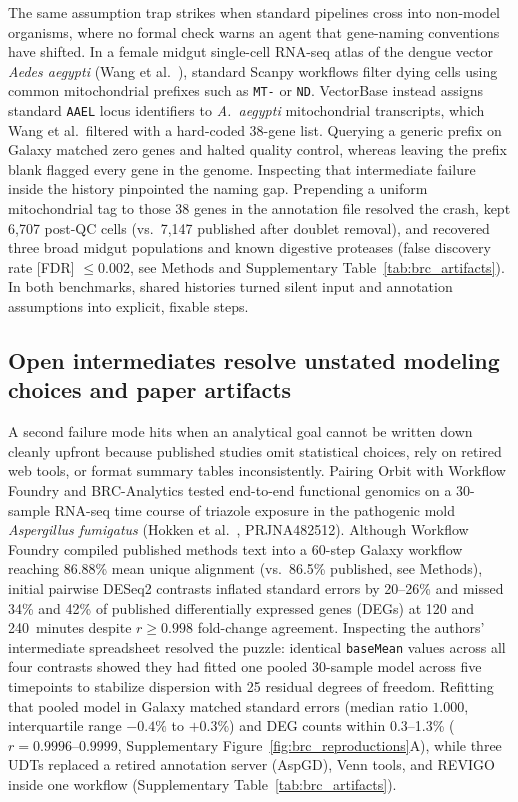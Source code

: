 \documentclass[11pt,letterpaper]{article}
\newcommand{\tool}[1]{\textsf{#1}}
\begin{document}
The same assumption trap strikes when standard pipelines cross into non-model organisms, where no formal check warns an agent that gene-naming conventions have shifted. In a female midgut single-cell RNA-seq atlas of the dengue vector \textit{Aedes aegypti} (Wang et al.\ \cite{wang2024}), standard \tool{Scanpy} workflows filter dying cells using common mitochondrial prefixes such as \texttt{MT-} or \texttt{ND}. VectorBase instead assigns standard \texttt{AAEL} locus identifiers to \textit{A.\ aegypti} mitochondrial transcripts, which Wang et al.\ filtered with a hard-coded 38-gene list. Querying a generic prefix on Galaxy matched zero genes and halted quality control, whereas leaving the prefix blank flagged every gene in the genome. Inspecting that intermediate failure inside the history pinpointed the naming gap. Prepending a uniform mitochondrial tag to those 38 genes in the annotation file resolved the crash, kept 6,707 post-QC cells (vs.\ 7,147 published after doublet removal), and recovered three broad midgut populations and known digestive proteases (false discovery rate [FDR] $\le 0.002$, see Methods and Supplementary Table~\ref{tab:brc_artifacts}). In both benchmarks, shared histories turned silent input and annotation assumptions into explicit, fixable steps.

\subsection{Open intermediates resolve unstated modeling choices and paper artifacts}

A second failure mode hits when an analytical goal cannot be written down cleanly upfront because published studies omit statistical choices, rely on retired web tools, or format summary tables inconsistently. Pairing \tool{Orbit} with \tool{Workflow Foundry} \cite{foundry2026} and \tool{BRC-Analytics} \cite{brcanalytics2026} tested end-to-end functional genomics on a 30-sample RNA-seq time course of triazole exposure in the pathogenic mold \textit{Aspergillus fumigatus} (Hokken et al.\ \cite{hokken2018}, PRJNA482512). Although \tool{Workflow Foundry} compiled published methods text into a 60-step Galaxy workflow reaching 86.88\% mean unique alignment (vs.\ 86.5\% published, see Methods), initial pairwise \tool{DESeq2} contrasts inflated standard errors by 20--26\% and missed 34\% and 42\% of published differentially expressed genes (DEGs) at 120 and 240~minutes despite $r \ge 0.998$ fold-change agreement. Inspecting the authors' intermediate spreadsheet resolved the puzzle: identical \texttt{baseMean} values across all four contrasts showed they had fitted one pooled 30-sample model across five timepoints to stabilize dispersion with 25 residual degrees of freedom. Refitting that pooled model in Galaxy matched standard errors (median ratio $1.000$, interquartile range $-0.4\%$ to $+0.3\%$) and DEG counts within 0.3--1.3\% ($r = 0.9996\text{--}0.9999$, Supplementary Figure~\ref{fig:brc_reproductions}A), while three UDTs replaced a retired annotation server (AspGD), Venn tools, and \tool{REVIGO} inside one workflow (Supplementary Table~\ref{tab:brc_artifacts}).
\end{document}

